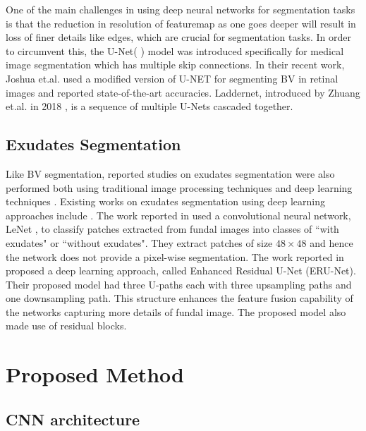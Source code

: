 \documentclass[utf8]{FrontiersinHarvard} %
\begin{document}
One of the main challenges in using deep neural networks for segmentation tasks is that the reduction in resolution of featuremap as one goes deeper will result in loss of finer details like edges, which are crucial for segmentation tasks. In order to circumvent this, the U-Net( \cite{ronneberger2015u}) model was introduced specifically for medical image segmentation which has multiple skip connections. In their recent work, Joshua et.al. \cite{joshua2020blood} used a modified version of U-NET for segmenting BV in retinal images and reported state-of-the-art accuracies. Laddernet, introduced by Zhuang et.al. in 2018 \cite{zhuang2018laddernet},  is a sequence of multiple U-Nets cascaded together.

\subsection{Exudates Segmentation}
Like BV segmentation, reported studies on exudates segmentation  were also performed both using traditional image processing techniques \cite{}  and deep learning techniques . Existing works on exudates segmentation using deep learning approaches include \cite{perdomo2017convolutional,tan2017automated, feng2017deep, zheng2018detection}. The work reported in \cite{perdomo2017convolutional,kou2020enhanced} used a convolutional neural network,  LeNet \cite{lecun1989handwritten}, to classify patches extracted from fundal images into classes of ``with exudates" or ``without exudates". They extract patches of size $48\times48$ and hence the network does not provide a pixel-wise segmentation.  The work reported in \cite{kou2020enhanced} proposed a deep learning approach, called Enhanced Residual U-Net (ERU-Net). Their proposed model had three U-paths each with three upsampling paths and one downsampling path. This structure enhances the feature fusion capability of the networks capturing more details of fundal image. The proposed model also made use of residual blocks.


\section{Proposed Method}
\subsection{CNN architecture}
\end{document}

